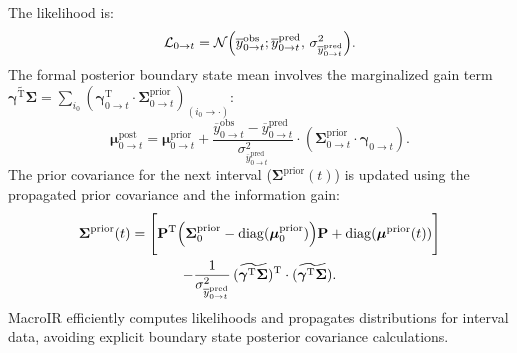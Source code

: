 \documentclass[pdflatex,sn-nature]{sn-jnl}%
\begin{document}
The likelihood is:
\begin{equation}
\mathcal{L}_{0 \rightarrow t} = \mathcal{N}\Bigl( \overline{y}^{\text{obs}}_{0 \rightarrow t} ; \overline{y}^{\text{pred}}_{0 \rightarrow t},\, \sigma^2_{\overline{y}^{\text{pred}}_{0 \rightarrow t}} \Bigr).
\label{eq:macroIR_likelihood} %
\end{equation}
The formal posterior boundary state mean involves the marginalized gain term \( \widetilde{\boldsymbol{\gamma}^{\mathrm{T}} \boldsymbol{\Sigma}} = \sum_{i_0} (\boldsymbol{\gamma}_{0 \rightarrow t}^{\mathrm{T}} \cdot \boldsymbol{\Sigma}^{\text{prior}}_{0 \rightarrow t})_{(i_0 \rightarrow \cdot)} \): %
\begin{equation}
    \boldsymbol{\mu}^{\text{post}}_{0 \rightarrow t} = \boldsymbol{\mu}^{\text{prior}}_{0 \rightarrow t} + \frac{\overline{y}^{\text{obs}}_{0 \rightarrow t} - \overline{y}^{\text{pred}}_{0 \rightarrow t}}{\sigma^2_{\overline{y}^{\text{pred}}_{0 \rightarrow t}}} \cdot (\boldsymbol{\Sigma}^{\text{prior}}_{0 \rightarrow t} \cdot \boldsymbol{\gamma}_{0 \rightarrow t}). %
    \label{eq:macro_interval_posterior_mean} %
\end{equation}
The prior covariance for the next interval (\( \boldsymbol{\Sigma}^{\text{prior}}(t) \)) is updated using the propagated prior covariance and the information gain:
\begin{multline}
    \boldsymbol{\Sigma}^{\text{prior}}(t) = \Biggl[ \mathbf{P}^{\mathrm{T}} \Bigl( \boldsymbol{\Sigma}^{\text{prior}}_{0} - \mathrm{diag}(\boldsymbol{\mu}^{\text{prior}}_{0}) \Bigr) \mathbf{P} + \mathrm{diag}(\boldsymbol{\mu}^{\text{prior}}(t)) \Biggr] \\
    - \frac{1}{\sigma^2_{\overline{y}^{\text{pred}}_{0 \rightarrow t}}} \, (\widetilde{\boldsymbol{\gamma}^{\mathrm{T}} \boldsymbol{\Sigma}})^{\mathrm{T}} \cdot (\widetilde{\boldsymbol{\gamma}^{\mathrm{T}} \boldsymbol{\Sigma}}).
    \label{eq:prior_covariance_update_0_t} %
\end{multline}
MacroIR efficiently computes likelihoods and propagates distributions for interval data, avoiding explicit boundary state posterior covariance calculations.
\end{document}
